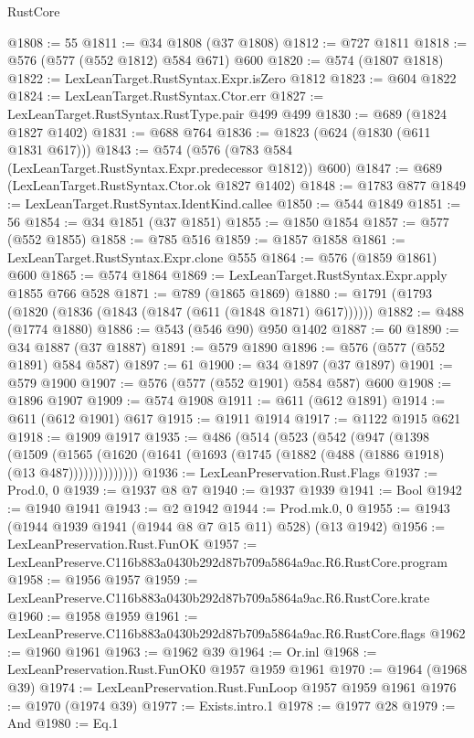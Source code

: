 \begin{lexlean}{RustCore}
\begin{coremodule}
@1808 := 55
@1811 := @34 @1808 (@37 @1808)
@1812 := @727 @1811
@1818 := @576 (@577 (@552 @1812) @584 @671) @600
@1820 := @574 (@1807 @1818)
@1822 := LexLeanTarget.RustSyntax.Expr.isZero @1812
@1823 := @604 @1822
@1824 := LexLeanTarget.RustSyntax.Ctor.err
@1827 := LexLeanTarget.RustSyntax.RustType.pair @499 @499
@1830 := @689 (@1824 @1827 @1402)
@1831 := @688 @764
@1836 := @1823 (@624 (@1830 (@611 @1831 @617)))
@1843 := @574 (@576 (@783 @584 (LexLeanTarget.RustSyntax.Expr.predecessor @1812)) @600)
@1847 := @689 (LexLeanTarget.RustSyntax.Ctor.ok @1827 @1402)
@1848 := @1783 @877
@1849 := LexLeanTarget.RustSyntax.IdentKind.callee
@1850 := @544 @1849
@1851 := 56
@1854 := @34 @1851 (@37 @1851)
@1855 := @1850 @1854
@1857 := @577 (@552 @1855)
@1858 := @785 @516
@1859 := @1857 @1858
@1861 := LexLeanTarget.RustSyntax.Expr.clone @555
@1864 := @576 (@1859 @1861) @600
@1865 := @574 @1864
@1869 := LexLeanTarget.RustSyntax.Expr.apply @1855 @766 @528
@1871 := @789 (@1865 @1869)
@1880 := @1791 (@1793 (@1820 (@1836 (@1843 (@1847 (@611 (@1848 @1871) @617))))))
@1882 := @488 (@1774 @1880)
@1886 := @543 (@546 @90) @950 @1402
@1887 := 60
@1890 := @34 @1887 (@37 @1887)
@1891 := @579 @1890
@1896 := @576 (@577 (@552 @1891) @584 @587)
@1897 := 61
@1900 := @34 @1897 (@37 @1897)
@1901 := @579 @1900
@1907 := @576 (@577 (@552 @1901) @584 @587) @600
@1908 := @1896 @1907
@1909 := @574 @1908
@1911 := @611 (@612 @1891)
@1914 := @611 (@612 @1901) @617
@1915 := @1911 @1914
@1917 := @1122 @1915 @621
@1918 := @1909 @1917
@1935 := @486
    (@514
      (@523
        (@542
          (@947
            (@1398
              (@1509
                (@1565
                  (@1620 (@1641 (@1693 (@1745 (@1882 (@488 (@1886 @1918) (@13 @487))))))))))))))
@1936 := LexLeanPreservation.Rust.Flags
@1937 := Prod.{0, 0}
@1939 := @1937 @8 @7
@1940 := @1937 @1939
@1941 := Bool
@1942 := @1940 @1941
@1943 := @2 @1942
@1944 := Prod.mk.{0, 0}
@1955 := @1943 (@1944 @1939 @1941 (@1944 @8 @7 @15 @11) @528) (@13 @1942)
@1956 := LexLeanPreservation.Rust.FunOK
@1957 := LexLeanPreserve.C116b883a0430b292d87b709a5864a9ac.R6.RustCore.program
@1958 := @1956 @1957
@1959 := LexLeanPreserve.C116b883a0430b292d87b709a5864a9ac.R6.RustCore.krate
@1960 := @1958 @1959
@1961 := LexLeanPreserve.C116b883a0430b292d87b709a5864a9ac.R6.RustCore.flags
@1962 := @1960 @1961
@1963 := @1962 @39
@1964 := Or.inl
@1968 := LexLeanPreservation.Rust.FunOK0 @1957 @1959 @1961
@1970 := @1964 (@1968 @39)
@1974 := LexLeanPreservation.Rust.FunLoop @1957 @1959 @1961
@1976 := @1970 (@1974 @39)
@1977 := Exists.intro.{1}
@1978 := @1977 @28
@1979 := And
@1980 := Eq.{1}

\end{coremodule}
\end{lexlean}
